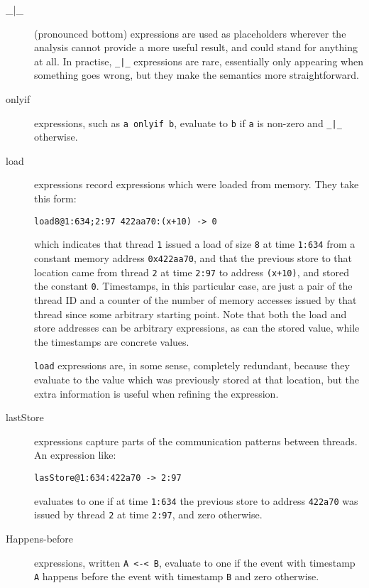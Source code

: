 \documentclass[10pt,a4paper]{report}
\begin{document}
\begin{description}
\item[\_|\_] (pronounced bottom) expressions are used as placeholders
  wherever the analysis cannot provide a more useful result, and could
  stand for anything at all.  In practise, \verb^_|_^ expressions are
  rare, essentially only appearing when something goes wrong, but they
  make the semantics more straightforward.

\item[onlyif] expressions, such as \verb|a onlyif b|, evaluate to
  \verb|b| if \verb|a| is non-zero and \verb^_|_^ otherwise.  

\item[load] expressions record expressions which were loaded from
  memory.  They take this form:

\begin{verbatim}
load8@1:634;2:97 422aa70:(x+10) -> 0
\end{verbatim}

  which indicates that thread \verb|1| issued a load of size \verb|8|
  at time \verb|1:634| from a constant memory address
  \verb|0x422aa70|, and that the previous store to that location came
  from thread \verb|2| at time \verb|2:97| to address \verb|(x+10)|,
  and stored the constant \verb|0|.  Timestamps, in this particular
  case, are just a pair of the thread ID and a counter of the number
  of memory accesses issued by that thread since some arbitrary
  starting point.  Note that both the load and store addresses can be
  arbitrary expressions, as can the stored value, while the timestamps
  are concrete values.

  \verb|load| expressions are, in some sense, completely redundant,
  because they evaluate to the value which was previously stored at
  that location, but the extra information is useful when refining the
  expression.

\item[lastStore] expressions capture parts of the communication
  patterns between threads.  An expression like:

\begin{verbatim}
lasStore@1:634:422a70 -> 2:97
\end{verbatim}

  evaluates to one if at time \verb|1:634| the previous store to
  address \verb|422a70| was issued by thread \verb|2| at time
  \verb|2:97|, and zero otherwise.

\item[Happens-before] expressions, written \verb|A <-< B|, evaluate to
  one if the event with timestamp \verb|A| happens before the event
  with timestamp \verb|B| and zero otherwise.


\end{description}
\end{document}
